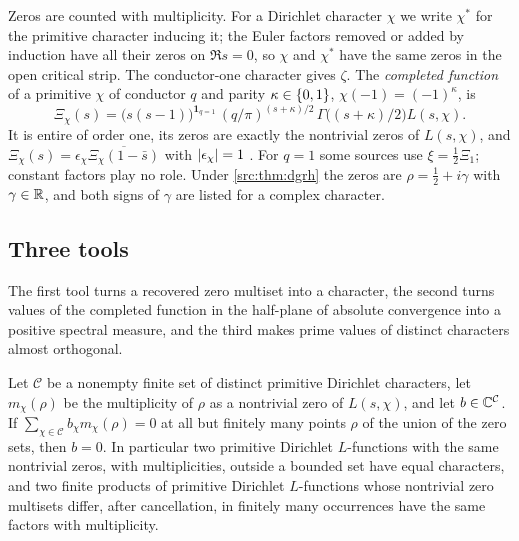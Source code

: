 Zeros are counted with multiplicity. For a Dirichlet character $\chi$ we write $\chi^*$ for
the primitive character inducing it; the Euler factors removed or added by induction have all
their zeros on $\Re s=0$, so $\chi$ and $\chi^*$ have the same zeros in the open critical
strip. The conductor-one character gives $\zeta$. The \emph{completed function} of a
primitive $\chi$ of conductor $q$ and parity $\kappa\in\{0,1\}$, $\chi(-1)=(-1)^\kappa$, is
\begin{equation}\label{rec:eq:completion}
 \Xi_\chi(s)=\bigl(s(s-1)\bigr)^{\mathbf 1_{q=1}}\,(q/\pi)^{(s+\kappa)/2}\,
 \Gamma\bigl((s+\kappa)/2\bigr)L(s,\chi).
\end{equation}
It is entire of order one, its zeros are exactly the nontrivial zeros of $L(s,\chi)$, and
$\Xi_\chi(s)=\epsilon_\chi\overline{\Xi_\chi(1-\bar s)}$ with $\lvert\epsilon_\chi\rvert=1$
\cite{Davenport2000Multiplicative}. For $q=1$ some sources use $\xi=\tfrac12\Xi_1$; constant
factors play no role. Under \cref{src:thm:dgrh} the zeros are $\rho=\tfrac12+i\gamma$ with
$\gamma\in\mathbb{R}$, and both signs of $\gamma$ are listed for a complex character.

\subsection{Three tools}\label{rec:sec:tools}

The first tool turns a recovered zero multiset into a character, the second turns values of
the completed function in the half-plane of absolute convergence into a positive spectral
measure, and the third makes prime values of distinct characters almost orthogonal.

\begin{corollary}\label{rec:lem:char}
Let $\mathcal C$ be a nonempty finite set of distinct primitive Dirichlet characters, let $m_\chi(\rho)$ be the
multiplicity of $\rho$ as a nontrivial zero of $L(s,\chi)$, and let $b\in\mathbb{C}^{\mathcal C}$. If
$\sum_{\chi\in\mathcal C}b_\chi m_\chi(\rho)=0$ at all but finitely many points $\rho$ of the union of the zero sets, then
$b=0$. In particular two primitive Dirichlet $L$-functions with the same nontrivial zeros, with
multiplicities, outside a bounded set have equal characters, and two finite products of primitive
Dirichlet $L$-functions whose nontrivial zero multisets differ, after cancellation, in finitely many
occurrences have the same factors with multiplicity.
\end{corollary}

